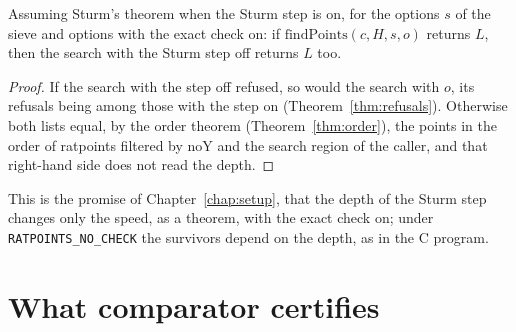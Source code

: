 \begin{theorem}\label{thm:sturmSpeed}
  \leanok
  Assuming Sturm's theorem when the Sturm step is on, for the options $s$ of the sieve and options
  with the exact check on: if $\mathrm{findPoints}(c, H, s, o)$ returns $L$, then the search with
  the Sturm step off returns $L$ too.
\end{theorem}

\begin{proof}
  \leanok
  If the search with the step off refused, so would the search with $o$, its refusals being among
  those with the step on (Theorem~\ref{thm:refusals}). Otherwise both lists equal, by the order
  theorem (Theorem~\ref{thm:order}), the points in the order of ratpoints filtered by $\mathrm{noY}$
  and the search region of the caller, and that right-hand side does not read the depth.
\end{proof}

This is the promise of Chapter~\ref{chap:setup}, that the depth of the Sturm step changes only the
speed, as a theorem, with the exact check on; under \verb|RATPOINTS_NO_CHECK| the survivors depend
on the depth, as in the C program.

\section{What comparator certifies}\label{sec:certifiedH}

